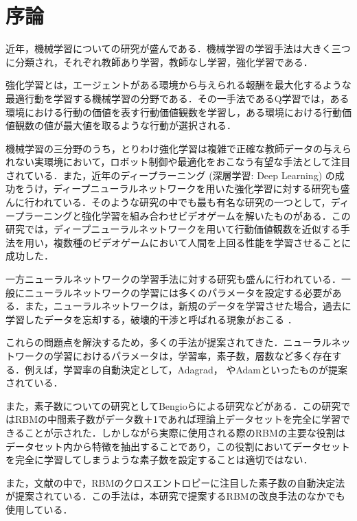 \chapter{序論}

近年，機械学習についての研究が盛んである．機械学習の学習手法は大きく三つに分類され，それぞれ教師あり学習，教師なし学習，強化学習である．

強化学習とは，エージェントがある環境から与えられる報酬を最大化するような最適行動を学習する機械学習の分野である．その一手法であるQ学習では，ある環境における行動の価値を表す行動価値観数を学習し，ある環境における行動価値観数の値が最大値を取るような行動が選択される．

機械学習の三分野のうち，とりわけ強化学習は複雑で正確な教師データの与えられない実環境において，ロボット制御や最適化をおこなう有望な手法として注目されている．また，近年のディープラーニング (深層学習: Deep Learning) の成功をうけ，ディープニューラルネットワークを用いた強化学習に対する研究も盛んに行われている．そのような研究の中でも最も有名な研究の一つとして，ディープラーニングと強化学習を組み合わせビデオゲームを解いたものがある．この研究では，ディープニューラルネットワークを用いて行動価値観数を近似する手法を用い，複数種のビデオゲームにおいて人間を上回る性能を学習させることに成功した．

一方ニューラルネットワークの学習手法に対する研究も盛んに行われている．一般にニューラルネットワークの学習には多くのパラメータを設定する必要がある．また，ニューラルネットワークは，新規のデータを学習させた場合，過去に学習したデータを忘却する，破壊的干渉と呼ばれる現象がおこる \cite{津守研二2010動的環境下で複数タスクを学習するニューラルネットモデル}．

これらの問題点を解決するため，多くの手法が提案されてきた．ニューラルネットワークの学習におけるパラメータは，学習率，素子数，層数など多く存在する．例えば，学習率の自動決定として，Adagrad\cite{duchi2011adaptive}， やAdam\cite{kingma2014adam}といったものが提案されている．

また，素子数についての研究としてBengioらによる研究\cite{le2008representational}などがある．この研究ではRBMの中間素子数がデータ数＋1であれば理論上データセットを完全に学習できることが示された．しかしながら実際に使用される際のRBMの主要な役割はデータセット内から特徴を抽出することであり，この役割においてデータセットを完全に学習してしまうような素子数を設定することは適切ではない．

また，文献\cite{osawa}の中で，RBMのクロスエントロピーに注目した素子数の自動決定法が提案されている．この手法は，本研究で提案するRBMの改良手法のなかでも使用している．

